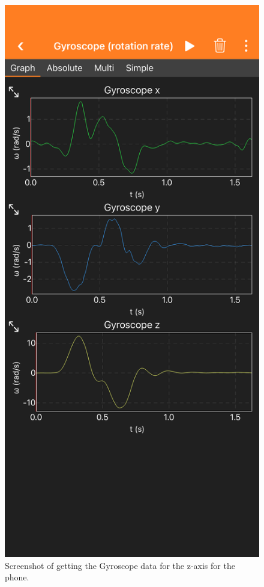 \documentclass[idxtotoc,hyperref,openany]{labbook} %
\begin{document}
\begin{figure}[H] %
\begin{center}
\includegraphics[width=.7\linewidth]{images/Lab.02/GyroscopeZ.PNG}
\end{center}
\caption{Screenshot of getting the Gyroscope data for the z-axis for the phone.}
\label{fig:Lab02-GyroscopeZ}
\end{figure}



\end{document}
